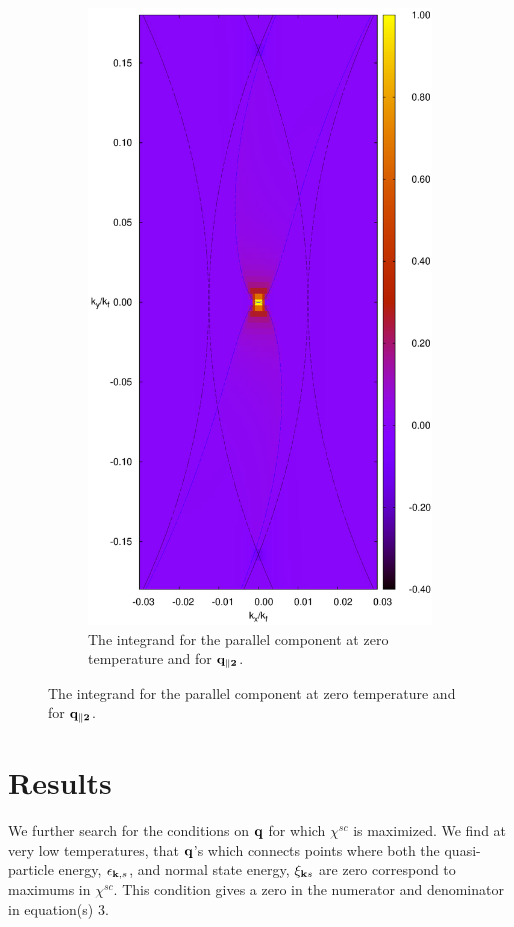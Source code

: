 \documentclass[usletter,aps,prb,10pt,amssymb,amsmath,twocolumn]{revtex4-1}
\begin{document}
\begin{figure}
\begin{subfigure}[b]{0.23\textwidth}
                \includegraphics[scale=0.2]{./figures/difference_par1.eps}
                \caption{The integrand for the parallel component at zero temperature and for $\bf{q}_{\parallel 2}$. }
        \end{subfigure}

 \end{figure}

\section{Results}
We further search for the conditions on ${\bf q}$ for which $\chi^{sc}$ is maximized. We find at very low temperatures, that ${\bf q}$'s which connects points where both the quasi-particle energy, $\epsilon_{{\bf k},s}$, and normal state energy, $\xi_{{\bf k}s}$ are zero correspond to maximums in $\chi^{sc}$. This condition gives a zero in the numerator and denominator in equation(s) 3.
\end{document}
